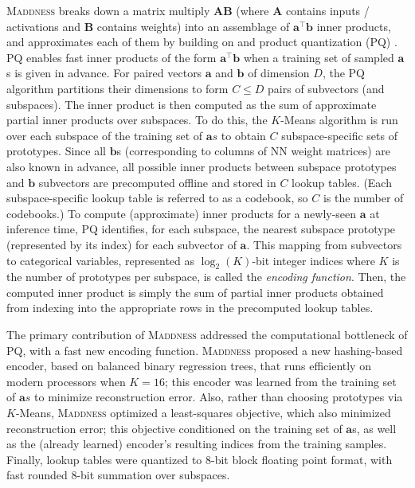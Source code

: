 \documentclass{article}
\begin{document}
\textsc{Maddness} breaks down a matrix multiply $\bm{A}\bm{B}$ (where $\bm{A}$ contains inputs / activations and $\bm{B}$ contains weights) into an assemblage of $\bm{a}^\top \bm{b}$ inner products, and approximates each of them by building on \citep{gray1984vector} and 
product quantization (PQ) \citep{gray1984vector,jegou2010product}. 
PQ enables fast inner products of the form $\bm{a}^\top \bm{b}$ when a training set of sampled $\bm{a}$s is given in advance. 
For paired vectors $\bm{a}$ and $\bm{b}$ of dimension $D$, the PQ algorithm partitions their dimensions to form $C \le D$ pairs of subvectors (and subspaces).
The inner product is then computed as the sum of approximate partial inner products over subspaces.
To do this, the $K$-Means algorithm is run over each subspace of the training set of $\bm{a}s$ to obtain $C$ subspace-specific sets of prototypes.
Since all $\bm{b}$s (corresponding to columns of NN weight matrices) are also known in advance, all possible inner products between subspace prototypes and $\bm{b}$ subvectors are precomputed offline and stored in $C$ lookup tables. 
(Each subspace-specific lookup table is referred to as a codebook, so $C$ is the number of codebooks.) 
To compute (approximate) inner products for a newly-seen $\bm{a}$ at inference time, PQ identifies, for each subspace, the nearest subspace prototype (represented by its index) for each subvector of $\bm{a}$.
This mapping from subvectors to categorical variables, represented as $\log_2(K)$-bit integer indices where $K$ is the number of prototypes per subspace, is called the \textit{encoding function}. 
Then, the computed inner product is simply the sum of partial inner products obtained from indexing into the appropriate rows in the precomputed lookup tables.

The primary contribution of \textsc{Maddness} addressed the computational bottleneck of PQ, with a fast new encoding function.
\textsc{Maddness} proposed a new hashing-based encoder, based on balanced binary regression trees, that runs efficiently on modern processors when $K=16$;
this encoder was learned from the training set of $\bm{a}s$ to minimize reconstruction error.
Also, rather than choosing prototypes via $K$-Means, \textsc{Maddness} optimized a least-squares objective, which also minimized reconstruction error; this objective conditioned on the training set of $\bm{a}$s, as well as the (already learned) encoder's resulting indices from the training samples. 
Finally, lookup tables were quantized to 8-bit block floating point format, with fast rounded 8-bit summation over subspaces.
\end{document}

